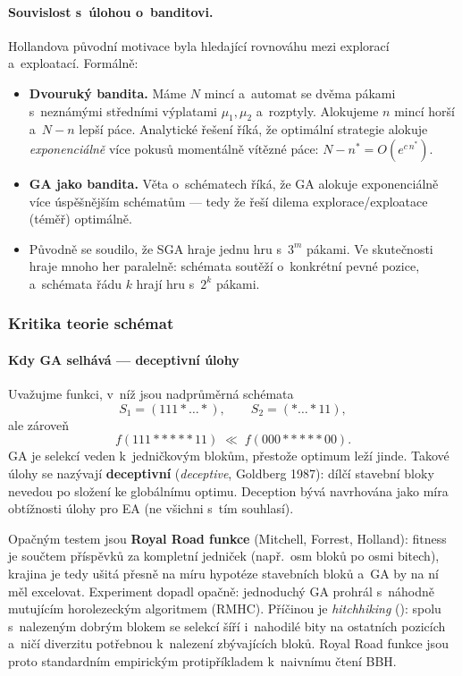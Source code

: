 \documentclass[11pt,a4paper]{article}
\theoremstyle{definition}
\begin{document}
\paragraph{Souvislost s~úlohou o~banditovi.} Hollandova původní motivace byla
 hledající rovnováhu mezi explorací a~exploatací. Formálně:
\begin{itemize}
\item \textbf{Dvouruký bandita.} Máme $N$ mincí a~automat se dvěma pákami
  s~neznámými středními výplatami $\mu_1, \mu_2$ a~rozptyly. Alokujeme
  $n$ mincí horší a~$N-n$ lepší páce. Analytické řešení říká, že optimální
  strategie alokuje \emph{exponenciálně} více pokusů momentálně vítězné páce:
  $N - n^* = O(e^{c\, n^*})$.
\item \textbf{GA jako bandita.} Věta o~schématech říká, že GA alokuje
  exponenciálně více  úspěšnějším schématům --- tedy
  že řeší dilema explorace/exploatace (téměř) optimálně.
\item Původně se soudilo, že SGA hraje jednu hru s~$3^m$ pákami. Ve
  skutečnosti hraje mnoho her paralelně: schémata soutěží o~konkrétní pevné
  pozice, a~schémata řádu $k$ hrají hru s~$2^k$ pákami.
\end{itemize}

\subsubsection{Kritika teorie schémat}

\paragraph{Kdy GA selhává --- deceptivní úlohy}

Uvažujme funkci, v~níž jsou nadprůměrná schémata
\[
S_1 = (111{*}\ldots{*}), \qquad S_2 = ({*}\ldots{*}11),
\]
ale zároveň
\[
f(111{*}{*}{*}{*}{*}11) \;\ll\; f(000{*}{*}{*}{*}{*}00).
\]
GA je selekcí veden
k~jedničkovým blokům, přestože optimum leží jinde. Takové úlohy se nazývají
\textbf{deceptivní} (\emph{deceptive}, Goldberg 1987): dílčí stavební bloky
nevedou po složení ke globálnímu optimu. Deception bývá navrhována jako míra
obtížnosti úlohy pro EA (ne všichni s~tím souhlasí).

Opačným testem jsou \textbf{Royal Road funkce} (Mitchell, Forrest, Holland):
fitness je součtem příspěvků za kompletní  jedniček (např.\ osm bloků po
osmi bitech), krajina je tedy ušitá přesně na míru hypotéze stavebních bloků a~GA
by na ní měl excelovat. Experiment dopadl opačně: jednoduchý GA prohrál s~náhodně
mutujícím horolezeckým algoritmem (RMHC). Příčinou je \emph{hitchhiking}
(): spolu s~nalezeným dobrým blokem se selekcí šíří i~nahodilé
 bity na ostatních pozicích a~ničí diverzitu potřebnou k~nalezení
zbývajících bloků. Royal Road funkce jsou proto standardním empirickým
protipříkladem k~naivnímu čtení BBH.
\end{document}
